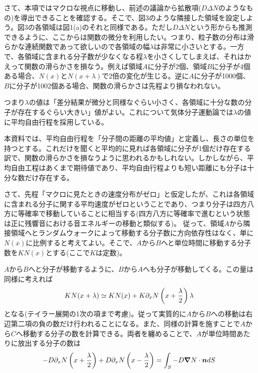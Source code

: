 \documentclass[dvipdfmx, 9pt, a4paper]{jsarticle}
\newcommand{\bm}[1]{{\mbox{\boldmath $#1$}}}
\begin{document}
さて、本項ではマクロな視点に移動し、前述の議論から拡散項($D\Delta N$のようなもの)を導出できることを確認する。そこで、図3のような隣接した領域を設定しよう。図3の各領域は図1(a)のそれと同様である。ただし$D\Delta N$という形からも推測できるように、ここからは関数の微分を利用したい。つまり、粒子数の分布は滑らかな連続関数であって欲しいので各領域の幅$\lambda$は非常に小さいとする。一方で、各領域に含まれる分子数が少なくなる程$\lambda$を小さくしてしまえば、それはかえって関数の滑らかさを損なう。例えば領域$A$に分子が2個、領域$B$に分子が4個ある場合、$N(x)$と$N(x+\lambda)$で2倍の変化が生じる。逆に$A$に分子が1000個、$B$に分子が1002個ある場合、関数の滑らかさは先程より損なわれない。\par
つまり$\lambda$の値は「差分結果が微分と同様なぐらい小さく、各領域に十分な数の分子が存在するぐらい大きい」値がよい。これについて気体分子運動論では$\lambda$の値に平均自由行程を採用している。\par
本資料では、平均自由行程を「分子間の距離の平均値」と定義し、長さの単位を持つとする。これだけを聞くと平均的に見れば各領域に分子が1個だけ存在する訳で、関数の滑らかさを損なうように思われるかもしれない。しかしながら、平均自由工程はあくまで期待値であり、平均自由行程よりも短い距離にも分子は十分な数だけ存在する。\par
さて、先程「マクロに見たときの速度分布がゼロ」と仮定したが、これは各領域に含まれる分子に関する平均速度がゼロということであり、つまり分子は四方八方に等確率で移動していることに相当する(四方八方に等確率で進むという状態は正に残響音における音エネルギーの移動と類似する)。
従って、領域$A$から隣接領域へとランダムウォークによって移動する分子数に方向依存性はなく、単に$N(x)$に比例すると考えてよい。そこで、$A$から$B$へと単位時間に移動する分子数を$KN(x)$とする(ここで$K$は定数)。\par
$A$から$B$へと分子が移動するように、$B$から$A$へも分子が移動してくる。この量は同様に考えれば
\begin{equation}
KN(x+\lambda) \simeq KN(x)+K\partial_xN\left(x +\frac{\lambda}{2} \right)\lambda \notag
\end{equation}
となる(テイラー展開の1次の項まで考慮)。従って実質的に$A$から$B$への移動は右辺第二項の負の数だけ行われることになる。また、同様の計算を施すことで$A$から$C$へ移動する分子の数を計算できる。両者を纏めることで、$A$が単位時間あたりに放出する分子の数は
\begin{equation}
-D\partial_xN\left(x +\frac{\lambda}{2} \right) + D\partial_xN\left(x -\frac{\lambda}{2} \right) = \int_S -D \bm \nabla N \cdot \bm n dS
\end{equation}
\end{document}
